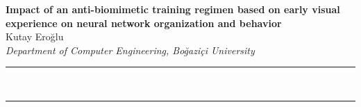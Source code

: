 \documentclass[a4paper,12pt]{article}
\renewenvironment{abstract}
 {\par\noindent\textbf{\abstractname}\ \ignorespaces \\}
 {\par\noindent\medskip}
\begin{document}
\pagestyle{fancy}
\thispagestyle{empty}
\fancyhead[L]{}
\renewcommand*{\thefootnote}{\fnsymbol{footnote}}
\begin{center}
\Large{\textbf{Impact of an anti-biomimetic training regimen based on early visual experience on neural network organization and behavior}}
\vspace{0.4cm}
\normalsize
\\ Kutay Eroğlu \\
\vspace{0.1cm}
\textit{Department of Computer Engineering, Boğaziçi University}
\medskip
\normalsize
\end{center}
{\color{gray}\hrule}
\vspace{0.4cm}
\begin{abstract}

\end{abstract}
{\color{gray}\hrule}
\medskip

%





\appendix

\end{document}
